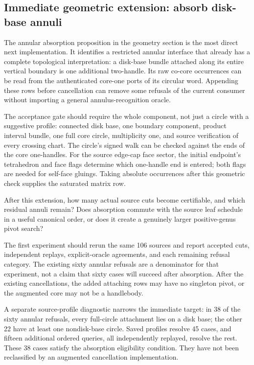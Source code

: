 \subsection{Immediate geometric extension: absorb disk-base annuli}

The annular absorption proposition in the geometry section is the most direct
next implementation.  It identifies a restricted annular interface that already
has a complete topological interpretation: a disk-base bundle attached along
its entire vertical boundary is one additional two-handle.  Its raw co-core
occurrences can be read from the authenticated core-one ports of its circular
word.  Appending these rows before cancellation can remove some refusals of
the current consumer without importing a general annulus-recognition oracle.

The acceptance gate should require the whole component, not just a circle
with a suggestive profile: connected disk base, one boundary component,
product interval bundle, one full core circle, multiplicity one, and source
verification of every crossing chart.  The circle's signed walk can be checked
against the ends of the core one-handles.  For the source edge-cap face sector,
the initial endpoint's tetrahedron and face flags determine which one-handle
end is entered; both flags are needed for self-face gluings.  Taking absolute
occurrences after this geometric check supplies the saturated matrix row.

\begin{question}
After this extension, how many actual source cuts become certifiable, and
which residual annuli remain?  Does absorption commute with the source leaf
schedule in a useful canonical order, or does it create a genuinely larger
positive-genus pivot search?
\end{question}

The first experiment should rerun the same 106 sources and report accepted
cuts, independent replays, explicit-oracle agreements, and each remaining
refusal category.  The existing sixty annular refusals are a denominator for
that experiment, not a claim that sixty cases will succeed after absorption.
After the existing cancellations, the added attaching rows may have no
singleton pivot, or the augmented core may not be a handlebody.

A separate source-profile diagnostic narrows the immediate target: in 38 of
the sixty annular refusals, every full-circle attachment lies on a disk base;
the other 22 have at least one nondisk-base circle.  Saved profiles resolve
45 cases, and fifteen additional ordered queries, all independently replayed,
resolve the rest.  These 38 cases satisfy the absorption eligibility condition.
They have not been reclassified by an augmented cancellation implementation.

